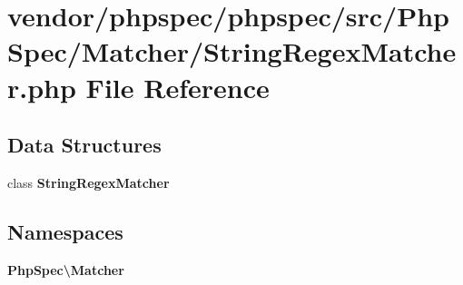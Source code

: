 \section{vendor/phpspec/phpspec/src/\+Php\+Spec/\+Matcher/\+String\+Regex\+Matcher.php File Reference}
\label{_string_regex_matcher_8php}
\subsection*{Data Structures}
\begin{DoxyCompactItemize}
\item 
class {\bf String\+Regex\+Matcher}
\end{DoxyCompactItemize}
\subsection*{Namespaces}
\begin{DoxyCompactItemize}
\item 
 {\bf Php\+Spec\textbackslash{}\+Matcher}
\end{DoxyCompactItemize}
